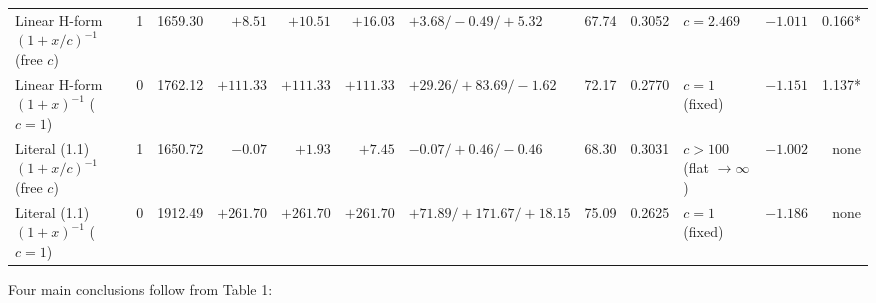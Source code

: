 \documentclass[11pt,a4paper]{article}
\begin{document}
\begin{landscape}
\begin{center}
\begin{adjustbox}{max width=\linewidth}
\begin{tabular}{lrrrrrlrrlrr}
{}Linear H-form $(1+x/c)^{-1}$ (free $c$) \dag{} & 1 & 1659.30 & $+8.51$ & $+10.51$ & $+16.03$ & $+3.68 / -0.49 / +5.32$ & 67.74 & 0.3052 & $c = 2.469$ & $-1.011$ & 0.166* \\
{}Linear H-form $(1+x)^{-1}$ ($c = 1$) \dag{} & 0 & 1762.12 & $+111.33$ & $+111.33$ & $+111.33$ & $+29.26 / +83.69 / -1.62$ & 72.17 & 0.2770 & $c = 1$ (fixed) & $-1.151$ & 1.137* \\
{}Literal (1.1) $(1+x/c)^{-1}$ (free $c$) \dag{} & 1 & 1650.72 & $-0.07$ & $+1.93$ & $+7.45$ & $-0.07 / +0.46 / -0.46$ & 68.30 & 0.3031 & $c > 100$ (flat $\to \infty$) & $-1.002$ & none \\
{}Literal (1.1) $(1+x)^{-1}$ ($c = 1$) \dag{} & 0 & 1912.49 & $+261.70$ & $+261.70$ & $+261.70$ & $+71.89 / +171.67 / +18.15$ & 75.09 & 0.2625 & $c = 1$ (fixed) & $-1.186$ & none \\
\hline
\end{tabular}
\end{adjustbox}
\end{center}
\end{landscape}

Four main conclusions follow from Table 1:
\end{document}
